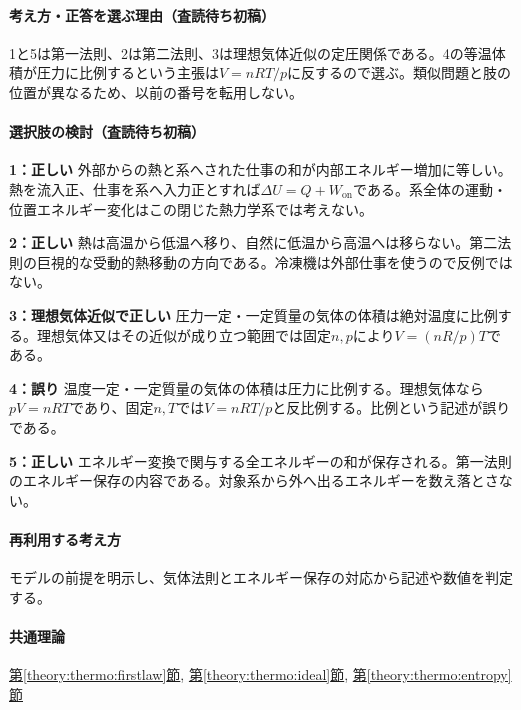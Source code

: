 \paragraph{考え方・正答を選ぶ理由（査読待ち初稿）} 1と5は第一法則、2は第二法則、3は理想気体近似の定圧関係である。4の等温体積が圧力に比例するという主張は\(V=nRT/p\)に反するので選ぶ。類似問題と肢の位置が異なるため、以前の番号を転用しない。

\paragraph{選択肢の検討（査読待ち初稿）}\mbox{}\par

\noindent\textbf{1：正しい} 外部からの熱と系へされた仕事の和が内部エネルギー増加に等しい。熱を流入正、仕事を系へ入力正とすれば\(\Delta U=Q+W_{\mathrm{on}}\)である。系全体の運動・位置エネルギー変化はこの閉じた熱力学系では考えない。\par

\noindent\textbf{2：正しい} 熱は高温から低温へ移り、自然に低温から高温へは移らない。第二法則の巨視的な受動的熱移動の方向である。冷凍機は外部仕事を使うので反例ではない。\par

\noindent\textbf{3：理想気体近似で正しい} 圧力一定・一定質量の気体の体積は絶対温度に比例する。理想気体又はその近似が成り立つ範囲では固定\(n,p\)により\(V=(nR/p)T\)である。\par

\noindent\textbf{4：誤り} 温度一定・一定質量の気体の体積は圧力に比例する。理想気体なら\(pV=nRT\)であり、固定\(n,T\)では\(V=nRT/p\)と反比例する。比例という記述が誤りである。\par

\noindent\textbf{5：正しい} エネルギー変換で関与する全エネルギーの和が保存される。第一法則のエネルギー保存の内容である。対象系から外へ出るエネルギーを数え落とさない。\par

\paragraph{再利用する考え方} モデルの前提を明示し、気体法則とエネルギー保存の対応から記述や数値を判定する。

\paragraph{共通理論} \hyperref[theory:thermo:firstlaw]{第\ref*{theory:thermo:firstlaw}節}, \hyperref[theory:thermo:ideal]{第\ref*{theory:thermo:ideal}節}, \hyperref[theory:thermo:entropy]{第\ref*{theory:thermo:entropy}節}

